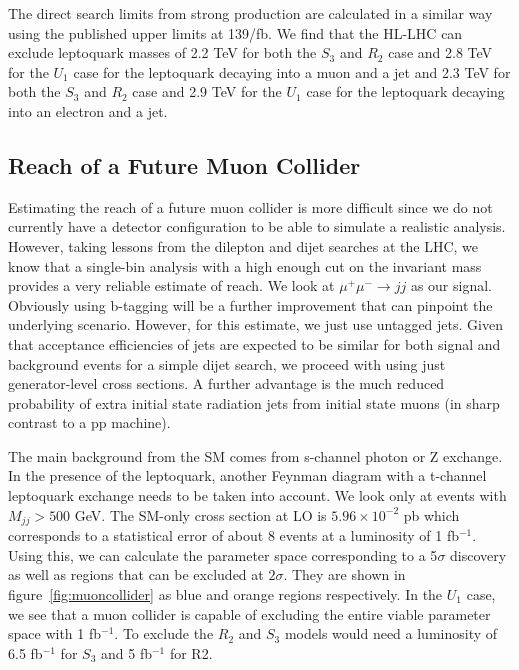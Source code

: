 \documentclass[12pt]{revtex4-2}
\numberwithin{equation}{section}
\begin{document}
The direct search limits from strong production are calculated in a similar way using the published upper limits at 139/fb.  We find that the HL-LHC can exclude leptoquark masses of 2.2 TeV for both the $S_3$ and $R_2$ case and 2.8 TeV for the $U_1$ case for the leptoquark decaying into a muon and a jet and 2.3 TeV for both the $S_3$ and $R_2$ case and 2.9 TeV for the $U_1$ case for the leptoquark decaying into an electron and a jet. 

\subsection{Reach of a Future Muon Collider}


Estimating the reach of a future muon collider is more difficult since we do not currently have a detector configuration to be able to simulate a realistic analysis.  However, taking lessons from the dilepton and dijet searches at the LHC, we know that a single-bin analysis with a high enough cut on the invariant mass provides a very reliable estimate of reach.  We look at $\mu^+ \mu^- \rightarrow jj$ as our signal.  Obviously using b-tagging will be a further improvement that can pinpoint the underlying scenario.  However, for this estimate, we just use untagged jets.  Given that acceptance efficiencies of jets are expected to be similar for both signal and background events for a simple dijet search, we proceed with using just generator-level cross sections.  A further advantage is the much reduced probability of extra initial state radiation jets from initial state muons (in sharp contrast to a pp machine).

The main background from the SM comes from s-channel photon or Z exchange.  In the presence of the leptoquark, another Feynman diagram with a t-channel leptoquark exchange needs to be taken into account.  We look only at events with $M_{jj} > 500$ GeV.  The SM-only cross section at LO is  $5.96 \times 10^{-2}$ pb which corresponds to a statistical error of about 8 events at a luminosity of 1 fb$^{-1}$.  Using this, we can calculate the parameter space corresponding to a 5$\sigma$ discovery as well as regions that can be excluded at $2\sigma$.  They are shown in figure~\ref{fig:muoncollider} as blue and orange regions respectively.  In the $U_1$ case, we see that a muon collider is capable of excluding the entire viable parameter space with 1 fb$^{-1}$.  To exclude the $R_2$ and $S_3$ models would need a luminosity of 6.5 fb$^{-1}$ for $S_3$ and 5 fb$^{-1}$ for R2.
\end{document}
